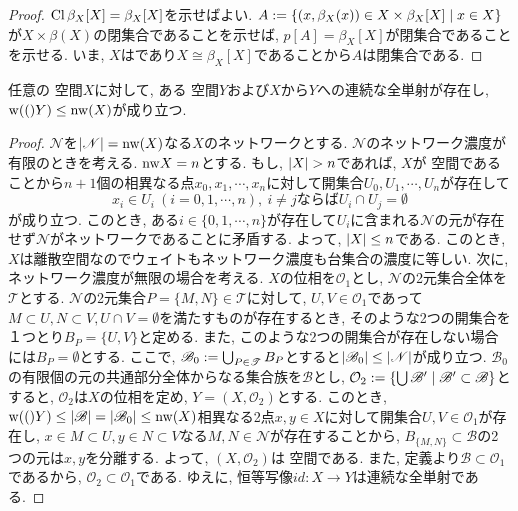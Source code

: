\documentclass[uplatex, dvipdfmx, a4paper, 12pt, class=jsbook, crop=false]{standalone}
\begin{document}
\begin{proof}
	$ \mathop{\mathrm{Cl}}\nolimits \beta_X [X] = \beta_X [X] $を示せばよい.
	$ A \defeq \setcomp{(x, \beta_X(x)) \in X \times \beta_X[X]}{x \in X } $が$ X \times \beta(X) $の閉集合であることを示せば, $ p[A] = \beta_X[X] $が閉集合であることを示せる.
	いま, $ X $は\Hausdorff であり$ X \cong \beta_X[X] $であることから$ A $は閉集合である.
\end{proof}

\begin{proposition}
	任意の \Hausdorff 空間$ X $に対して, ある \Hausdorff 空間$ Y $および$ X $から$ Y $への連続な全単射が存在し, $ \topweight(Y) \leq \topnetwork(X) $が成り立つ.
\end{proposition}

\begin{proof}
    $ \mathscr{N} $を$ \left|\mathscr{N}\right| = \mathrm{nw}(X) $なる$ X $のネットワークとする.
	$ \mathscr{N} $のネットワーク濃度が有限のときを考える.
	$ \mathrm{nw}{X} = n $とする.
	もし, $ \left|X\right| > n $であれば, $ X $が \Hausdorff 空間であることから$ n+1 $個の相異なる点$ x_0, x_1, \cdots , x_n $に対して開集合$ U_0, U_1, \cdots, U_n $が存在して
	\[ x_i \in U_i \ (i = 0, 1, \cdots, n), \ i \neq j \mbox{ならば} U_i \cap U_j = \emptyset \]
    が成り立つ.
	このとき, ある$ i \in \{0, 1, \cdots, n\} $が存在して$ U_i $に含まれる$ \mathscr{N} $の元が存在せず$ \mathscr{N} $がネットワークであることに矛盾する.
	よって, $ \left|X\right| \leq n $である.
	このとき, $ X $は離散空間なのでウェイトもネットワーク濃度も台集合の濃度に等しい.
    次に, ネットワーク濃度が無限の場合を考える.
	$ X $の位相を$ \mathcal{O}_1 $とし, $ \mathscr{N} $の2元集合全体を$ \mathscr{T} $とする.
	$ \mathscr{N} $の2元集合$ P = \{M, N\} \in \mathscr{T} $に対して, $ U, V \in \mathcal{O}_1 $であって$ M \subset U, N \subset V, U \cap V = \emptyset $を満たすものが存在するとき, そのような2つの開集合を１つとり$ B_P = \{U, V\} $と定める.
	また, このような2つの開集合が存在しない場合には$ B_P = \emptyset $とする.
	ここで, $ \mathscr{B}_0 \mathrel{:=} \bigcup_{P\in \mathscr{T}} B_P $とすると$ \left|\mathscr{B}_0\right| \leq \left|\mathscr{N}\right| $が成り立つ.
	$ \mathscr{B}_0 $の有限個の元の共通部分全体からなる集合族を$ \mathscr{B} $とし, $ \mathcal{O}_2 \defeq \setcomp{\bigcup \mathscr{B}'}{\mathscr{B}' \subset \mathscr{B}} $とすると, $ \mathcal{O}_2 $は$ X $の位相を定め, $ Y = (X, \mathcal{O}_2) $とする.
	このとき, $ \topweight(Y) \leq \cardinality{\mathscr{B}} = \cardinality{\mathscr{B}_0} \leq \topnetwork(X) $相異なる2点$ x, y \in X $に対して開集合$ U, V \in \mathcal{O}_1 $が存在し, $ x \in M \subset U, y \in N \subset V $なる$ M, N \in \mathscr{N} $が存在することから, $ B_{\{M, N\}} \subset \mathscr{B} $の2つの元は$ x, y $を分離する.
	よって, $ (X, \mathcal{O}_2) $は \Hausdorff 空間である.
	また, 定義より$ \mathscr{B} \subset \mathcal{O}_1 $であるから, $ \mathcal{O}_2 \subset \mathcal{O}_1 $である.
	ゆえに, 恒等写像$ id \colon X \to Y $は連続な全単射である.
\end{proof}
\end{document}

